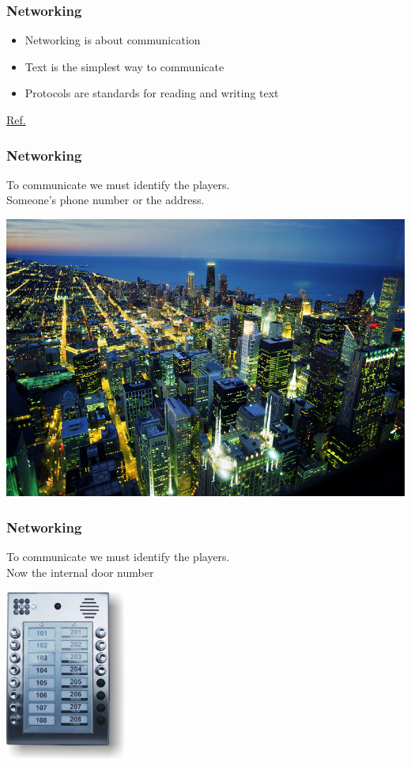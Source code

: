 
\begin{frame}
\frametitle{Networking}
\begin{itemize}
\item Networking is about communication
\item Text is the simplest way to communicate
\item Protocols are standards for reading and writing text
\end{itemize}
\tiny
\href{https://betterexplained.com/articles/a-simple-introduction-to-computer-networking/}{Ref.}
\normalsize
\end{frame}


\begin{frame}
\frametitle{Networking}
To communicate we must identify the players.\\

Someone's phone number or the address.
\begin{center}
\includegraphics[width=\columnwidth]{./Figure/network/ChicagovanafSearsTower}
\end{center}
\end{frame}


\begin{frame}
\frametitle{Networking}
To communicate we must identify the players.\\

Now the internal door number
\begin{center}
\includegraphics[width=4cm]{./Figure/network/BellGuard_Front_small}
\end{center}
\end{frame}


